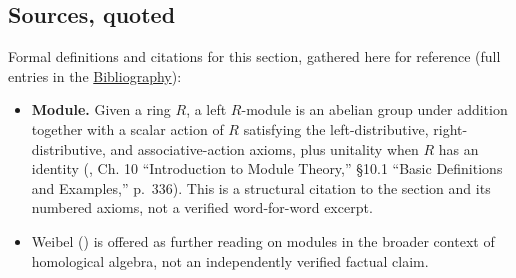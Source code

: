 \subsection{Sources, quoted}\label{sec:11-modules:01-definition:2}

Formal definitions and citations for this section, gathered here for reference (full entries in the \hyperref[sec:root:bibliography:1]{Bibliography}):

\begin{itemize}
\tightlist
\item
  \textbf{Module.} Given a ring \(R\), a left \(R\)-module is an abelian group under addition together with a scalar action of \(R\) satisfying the left-distributive, right-distributive, and associative-action axioms, plus unitality when \(R\) has an identity (\cite{DummitFoote2003}, Ch. 10 ``Introduction to Module Theory,'' §10.1 ``Basic Definitions and Examples,'' p.~336). This is a structural citation to the section and its numbered axioms, not a verified word-for-word excerpt.
\item
  Weibel (\cite{Weibel1994}) is offered as further reading on modules in the broader context of homological algebra, not an independently verified factual claim.
\end{itemize}
